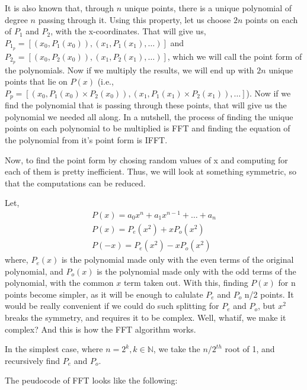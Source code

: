 \documentclass[12pt]{article}
\begin{document}
It is also known that, through $n$ unique points, there is a unique polynomial of degree $n$ passing through it. Using this property, let us choose $2n$ points on each of $P_1$ and $P_2$, with the x-coordinates. That will give us, $P_{1_p} = [(x_0, P_1(x_0)), (x_1, P_1(x_1), \dots)]$ and $P_{2_p} = [(x_0, P_2(x_0)), (x_1, P_2(x_1), \dots)]$, which we will call the point form of the polynomials. Now if we multiply the results, we will end up with $2n$ unique points that lie on $P(x)$ (i.e., $P_p = [(x_0, P_1(x_0)\times P_2(x_0)), (x_1, P_1(x_1)\times P_2(x_1)), \dots]$). Now if we find the polynomial that is passing through these points, that will give us the polynomial we needed all along.
In a nutshell, the process of finding the unique points on each polynomial to be multiplied is FFT and finding the equation of the polynomial from it's point form is IFFT.

Now, to find the point form by chosing random values of x and computing for each of them is pretty inefficient. Thus, we will look at something symmetric, so that the computations can be reduced.

Let,
\begin{align*}
    P(x) = a_0x^n + a_1x^{n-1} + \dots + a_n\\
    P(x) = P_e(x^2) + xP_o(x^2)\\
    P(-x) = P_e(x^2) -xP_o(x^2)
\end{align*}
where, $P_e(x)$ is the polynomial made only with the even terms of the original polynomial, and $P_o(x)$ is the polynomial made only with the odd terms of the polynomial, with the common $x$ term taken out.
With this, finding $P(x)$ for n points become simpler, as it will be enough to calulate $P_e$ and $P_o$ n/2 points. It would be really convenient if we could do such splitting for $P_e$ and $P_o$, but $x^2$ breaks the symmetry, and requires it to be complex. Well, whatif, we make it complex? And this is how the FFT algorithm works.

In the simplest case, where $n=2^k,k\in \mathbb{N}$, we take the $n/2^{th}$ root of 1, and recursively find $P_e$ and $P_o$.

The peudocode of FFT looks like the following:
\end{document}
